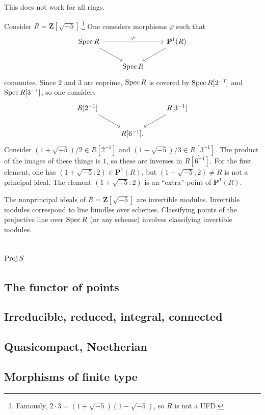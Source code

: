 \documentclass [11 pt, oneside, margin = 1 in] {article}
\begin{document}
This does not work for all rings.

\begin{example}[ ]\label{}\text{}
Consider $R=\mathbf{Z}[\sqrt{-5} ]$.\footnote{Famously, $2\cdot 3 = (1+\sqrt{-5} ) (1-\sqrt{-5} )$, so $R$ is not a UFD.} One considers morphisms $\varphi$ such that
\[
\begin{tikzcd}
	\Spec R \ar[rr,"\varphi"] \ar[dr] &&\mathbf{P}^1(R)\ar[dl]\\
				       &\Spec R
\end{tikzcd}
\]
commutes. Since $2$ and $3$ are coprime, $\operatorname{Spec} R$ is covered by $\operatorname{Spec} R[2^{-1}]$ and $\operatorname{Spec} R[3^{-1}]$, so one considers
\[
\begin{tikzcd}
	R[2^{-1}] \ar[rd] && R[3^{-1}] \ar[dl]\\
			  &R[6^{-1}].
\end{tikzcd}
\]
Consider $(1+\sqrt{-5} ) /2\in R[2^{-1}]$ and $(1-\sqrt{-5} ) /3\in R[3^{-1}]$. The product of the images of these things is $1$, so these are inverses in $R[6^{-1}]$. For the first element, one has $(1+\sqrt{-5}:2 ) \in \mathbf{P}^1(R)$, but $(1+\sqrt{-5}, 2 ) \ne R$ is not a principal ideal. The element $(1+\sqrt{-5}:2 )$ is an ``extra'' point of $\mathbf{P}^1(R)$. 
\end{example}

\begin{remark}
	The nonprincipal ideals of $R=\mathbf{Z}[\sqrt{-5}] $ are invertible modules. Invertible modules correspond to line bundles over schemes. Classifying points of the projective line over $\operatorname{Spec} R$ (or any scheme) involves classifying invertible modules.
\end{remark}
\subsection{$\operatorname{Proj} S$}
\subsection{The functor of points}
\subsection{Irreducible, reduced, integral, connected}
\subsection{Quasicompact, Noetherian}
\subsection{Morphisms of finite type}
\end{document}
